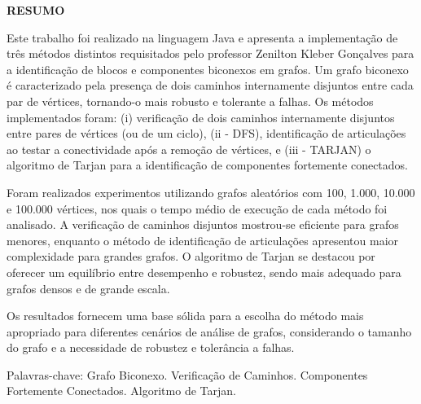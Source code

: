 
\begin{newpage}
	\thispagestyle{empty}
	\setlength{\baselineskip}{1.5\baselineskip} %
	\begin{center}
		\textbf{RESUMO} \\ [1.5\baselineskip]
	\end{center}
	\singlespace
	\noindent 
Este trabalho foi realizado na linguagem Java e apresenta a implementação de três métodos distintos requisitados pelo professor Zenilton Kleber Gonçalves para a identificação de blocos e componentes biconexos em grafos. Um grafo biconexo é caracterizado pela presença de dois caminhos internamente disjuntos entre cada par de vértices, tornando-o mais robusto e tolerante a falhas. Os métodos implementados foram: (i) verificação de dois caminhos internamente disjuntos entre pares de vértices (ou de um ciclo), (ii - DFS), identificação de articulações ao testar a conectividade após a remoção de vértices, e (iii - TARJAN) o algoritmo de Tarjan para a identificação de componentes fortemente conectados.

Foram realizados experimentos utilizando grafos aleatórios com 100, 1.000, 10.000 e 100.000 vértices, nos quais o tempo médio de execução de cada método foi analisado. A verificação de caminhos disjuntos mostrou-se eficiente para grafos menores, enquanto o método de identificação de articulações apresentou maior complexidade para grandes grafos. O algoritmo de Tarjan se destacou por oferecer um equilíbrio entre desempenho e robustez, sendo mais adequado para grafos densos e de grande escala.

Os resultados fornecem uma base sólida para a escolha do método mais apropriado para diferentes cenários de análise de grafos, considerando o tamanho do grafo e a necessidade de robustez e tolerância a falhas.
        \vspace{1.5\baselineskip} 
	\par
        \noindent Palavras-chave: {Grafo Biconexo. Verificação de Caminhos. Componentes Fortemente Conectados. Algoritmo de Tarjan.}%
\end{newpage}


